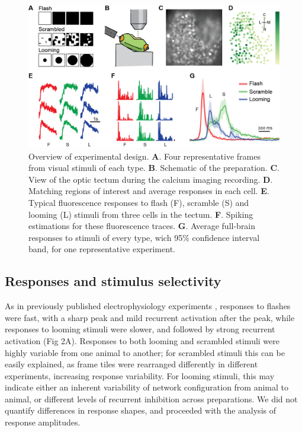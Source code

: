 \documentclass{article}
\begin{document}
\begin{figure}
\includegraphics[width=\linewidth]{fig1.png}
\caption{
Overview of experimental design. \textbf{A}. Four representative frames from visual stimuli of each type. \textbf{B}. Schematic of the preparation. \textbf{C}. View of the optic tectum during the calcium imaging recording. \textbf{D}. Matching regions of interest and average responses in each cell. \textbf{E}. Typical fluorescence responses to flash (F), scramble (S) and looming (L) stimuli from three cells in the tectum. \textbf{F}. Spiking estimations for these fluorescence traces. \textbf{G}. Average full-brain responses to stimuli of every type, wich 95\% confidence interval band, for one representative experiment. }
\end{figure}

\subsection*{Responses and stimulus selectivity}

As in previously published electrophysiology experiments \citep{khakhalin2014}, responses to flashes were fast, with a sharp peak and mild recurrent activation after the peak, while responses to looming stimuli were slower, and followed by strong recurrent activation (Fig 2A). Responses to both looming and scrambled stimuli were highly variable from one animal to another; for scrambled stimuli this can be easily explained, as frame tiles were rearranged differently in different experiments, increasing response variability. For looming stimuli, this may indicate either an inherent variability of network configuration from animal to animal, or different levels of recurrent inhibition across preparations. We did not quantify differences in response shapes, and proceeded with the analysis of response amplitudes.
\end{document}
